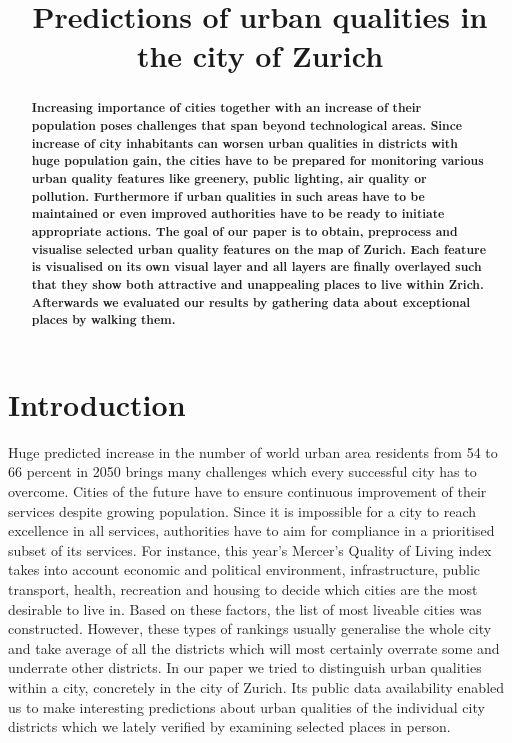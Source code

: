 \documentclass[letterpaper]{article}
\title{Predictions of urban qualities in the city of Zurich}
\begin{document}
%
\maketitle
%

\begin{abstract}
\textbf{
Increasing importance of cities together with an increase of their population poses challenges that span beyond
technological areas. Since increase of city inhabitants can worsen urban qualities in districts with huge
population gain, the cities have to be prepared for monitoring various urban quality features like greenery,
public lighting, air quality or pollution. Furthermore if urban qualities in such areas have to be maintained or
even improved authorities have to be ready to initiate appropriate actions. The goal of our paper is to obtain,
preprocess and visualise selected urban quality features on the map of Zurich. Each feature is visualised
on its own visual layer and all layers are finally overlayed such that they show both attractive and unappealing
places to live within Zrich. Afterwards we evaluated our results by gathering data about exceptional places
by walking them.
}
\end{abstract}

\section{Introduction}\label{sec:intro}
Huge predicted increase in the number of world urban area residents from 54 to 66 percent in 2050 brings many challenges
which every successful city has to overcome. Cities of the future have to ensure continuous improvement of their
services despite growing population. Since it is impossible for a city to reach excellence in all services,
authorities have to aim for compliance in a prioritised subset of its services. For instance, this year's Mercer's Quality of Living index\cite{mercer}
takes into account economic and political environment, infrastructure, public transport, health, recreation and housing
to decide which cities are the most desirable to live in. Based on these factors, the list of most liveable cities was constructed.
However, these types of rankings usually generalise the whole city and take average of all the districts which will
most certainly overrate some and underrate other districts. In our paper we tried to distinguish urban qualities within a city, concretely in the city of Zurich.
Its public data availability enabled us to make interesting predictions about urban qualities of the individual city districts
which we lately verified by examining selected places in person.
\end{document}

